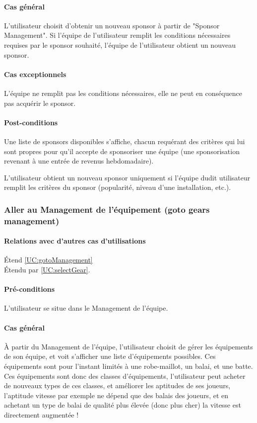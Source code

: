 \begin{list}{}{\leftmargin=1.5em}
\paragraph{Cas général}
L'utilisateur choisit d'obtenir un nouveau sponsor à partir de "Sponsor Management". Si l'équipe de l'utilisateur remplit les conditions nécessaires requises par le sponsor souhaité, l'équipe de l'utilisateur obtient un nouveau sponsor. 
\paragraph{Cas exceptionnels}
L'équipe ne remplit pas les conditions nécessaires, elle ne peut en conséquence pas acquérir le sponsor. 
\paragraph{Post-conditions}
\begin{list}{}{\leftmargin=1.5em}
\item{Une liste de sponsors disponibles s'affiche, chacun requérant des critères qui lui sont propres pour qu'il accepte de sponsoriser une équipe (une sponsorisation revenant à une entrée de revenus hebdomadaire).}
\item{L'utilisateur obtient un nouveau sponsor uniquement si l'équipe dudit utilisateur remplit les critères du sponsor (popularité, niveau d'une installation, etc.).}
\end{list}

\subsubsection{Aller au Management de l'équipement (goto gears management)}
\label{UC:gotoGear}
\paragraph{Relations avec d'autres cas d'utilisations}
Étend \ref{UC:gotoManagement}\\
Étendu par \ref{UC:selectGear}.
\paragraph{Pré-conditions}
\begin{list}{}{\leftmargin=1.5em}
\item{L'utilisateur se situe dans le Management de l'équipe.}
\end{list}
\paragraph{Cas général}
À partir du Management de l'équipe, l'utilisateur choisit de gérer les équipements de son équipe, et voit s'afficher une liste d'équipements possibles. Ces équipements sont pour l'instant limités à une robe-maillot, un balai, et une batte. Ces équipements sont donc des classes d'équipements, l'utilisateur peut acheter de nouveaux types de ces classes, et améliorer les aptitudes de ses joueurs, l'aptitude vitesse par exemple ne dépend que des balais des joueurs, et en achetant un type de balai de qualité plus élevée (donc plus cher) la vitesse est directement augmentée !

\end{list}
